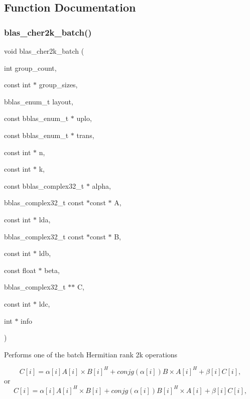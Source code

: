 \subsection{Function Documentation}
\mbox{\label{group__her2k__batch_gac4edc9f4c3f96b878e856a7aedba5d2d}} 
\subsubsection{\texorpdfstring{blas\+\_\+cher2k\+\_\+batch()}{blas\_cher2k\_batch()}}
{\footnotesize\ttfamily void blas\+\_\+cher2k\+\_\+batch (\begin{DoxyParamCaption}\item[{int}]{group\+\_\+count,  }\item[{const int $\ast$}]{group\+\_\+sizes,  }\item[{bblas\+\_\+enum\+\_\+t}]{layout,  }\item[{const bblas\+\_\+enum\+\_\+t $\ast$}]{uplo,  }\item[{const bblas\+\_\+enum\+\_\+t $\ast$}]{trans,  }\item[{const int $\ast$}]{n,  }\item[{const int $\ast$}]{k,  }\item[{const bblas\+\_\+complex32\+\_\+t $\ast$}]{alpha,  }\item[{bblas\+\_\+complex32\+\_\+t const $\ast$const $\ast$}]{A,  }\item[{const int $\ast$}]{lda,  }\item[{bblas\+\_\+complex32\+\_\+t const $\ast$const $\ast$}]{B,  }\item[{const int $\ast$}]{ldb,  }\item[{const float $\ast$}]{beta,  }\item[{bblas\+\_\+complex32\+\_\+t $\ast$$\ast$}]{C,  }\item[{const int $\ast$}]{ldc,  }\item[{int $\ast$}]{info }\end{DoxyParamCaption})}

Performs one of the batch Hermitian rank 2k operations

\[ C[i] = \alpha[i] A[i] \times B[i]^H + conjg( \alpha[i] ) B \times A[i]^H + \beta[i] C[i], \] or \[ C[i] = \alpha[i] A[i]^H \times B[i] + conjg( \alpha[i] ) B[i]^H \times A[i] + \beta[i] C[i], \]

